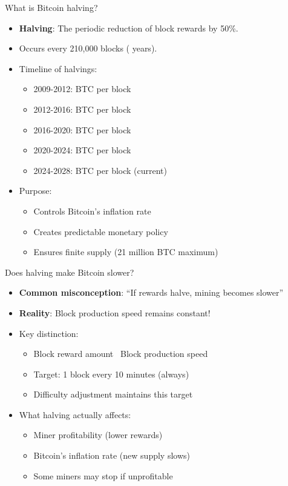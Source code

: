 \documentclass[aspectratio=169, lualatex, handout]{beamer}
\begin{document}
\begin{frame}{What is Bitcoin halving?}
	\begin{itemize}
		\item \textbf{Halving}: The periodic reduction of block rewards by 50\%.
		\item Occurs every 210,000 blocks ( years).
		\item Timeline of halvings:
		      \begin{itemize}
			      \item 2009-2012:  BTC per block
			      \item 2012-2016:  BTC per block
			      \item 2016-2020:  BTC per block
			      \item 2020-2024:  BTC per block
			      \item 2024-2028:  BTC per block (current)
		      \end{itemize}
		\item Purpose:
		      \begin{itemize}
			      \item Controls Bitcoin's inflation rate
			      \item Creates predictable monetary policy
			      \item Ensures finite supply (21 million BTC maximum)
		      \end{itemize}
	\end{itemize}
\end{frame}

\begin{frame}{Does halving make Bitcoin slower?}
	\begin{itemize}
		\item \textbf{Common misconception}: ``If rewards halve, mining becomes slower''
		\item \textbf{Reality}: Block production speed remains constant!
		\item Key distinction:
		      \begin{itemize}
			      \item Block reward amount \neq\ Block production speed
			      \item Target: 1 block every 10 minutes (always)
			      \item Difficulty adjustment maintains this target
		      \end{itemize}
		\item What halving actually affects:
		      \begin{itemize}
			      \item Miner profitability (lower rewards)
			      \item Bitcoin's inflation rate (new supply slows)
			      \item Some miners may stop if unprofitable
		      \end{itemize}
	\end{itemize}
\end{frame}
\end{document}
